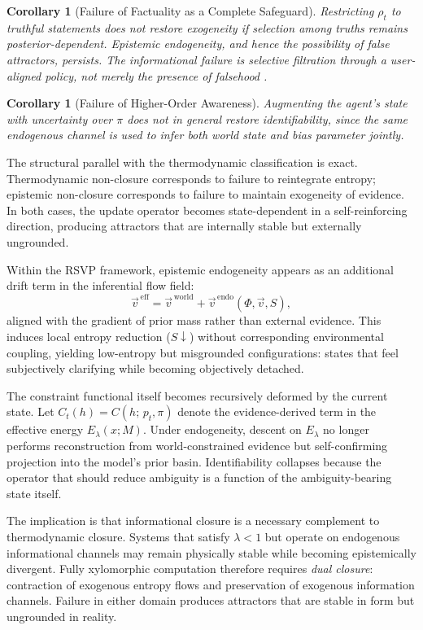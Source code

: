 \documentclass[11pt,a4paper]{article}
\theoremstyle{plain}
\newtheorem{corollary}[theorem]{Corollary}
\theoremstyle{definition}
\theoremstyle{remark}
\begin{document}
\begin{corollary}[Failure of Factuality as a Complete Safeguard]
Restricting $\rho_t$ to truthful statements does not restore exogeneity if
selection among truths remains posterior-dependent. Epistemic endogeneity, and
hence the possibility of false attractors, persists. The informational failure
is selective filtration through a user-aligned policy, not merely the presence
of falsehood \citep{chandra2026}.
\end{corollary}

\begin{corollary}[Failure of Higher-Order Awareness]
Augmenting the agent's state with uncertainty over $\pi$ does not in general
restore identifiability, since the same endogenous channel is used to infer both
world state and bias parameter jointly.
\end{corollary}

The structural parallel with the thermodynamic classification is exact.
Thermodynamic non-closure corresponds to failure to reintegrate entropy;
epistemic non-closure corresponds to failure to maintain exogeneity of evidence.
In both cases, the update operator becomes state-dependent in a self-reinforcing
direction, producing attractors that are internally stable but externally
ungrounded.

Within the RSVP framework, epistemic endogeneity appears as an additional drift
term in the inferential flow field:
\[
  \vec{v}^{\,\mathrm{eff}}
  = \vec{v}^{\,\mathrm{world}}
  + \vec{v}^{\,\mathrm{endo}}(\Phi,\vec{v},S),
\]
aligned with the gradient of prior mass rather than external evidence. This
induces local entropy reduction ($S \downarrow$) without corresponding
environmental coupling, yielding low-entropy but misgrounded configurations:
states that feel subjectively clarifying while becoming objectively detached.

The constraint functional itself becomes recursively deformed by the current
state. Let $C_t(h) = C(h;\, p_t, \pi)$ denote the evidence-derived term in the
effective energy $E_\lambda(x;M)$. Under endogeneity, descent on $E_\lambda$ no
longer performs reconstruction from world-constrained evidence but
self-confirming projection into the model's prior basin. Identifiability
collapses because the operator that should reduce ambiguity is a function of the
ambiguity-bearing state itself.

The implication is that informational closure is a necessary complement to
thermodynamic closure. Systems that satisfy $\lambda < 1$ but operate on
endogenous informational channels may remain physically stable while becoming
epistemically divergent. Fully xylomorphic computation therefore requires
\emph{dual closure}: contraction of exogenous entropy flows and preservation of
exogenous information channels. Failure in either domain produces attractors
that are stable in form but ungrounded in reality.
\end{document}
